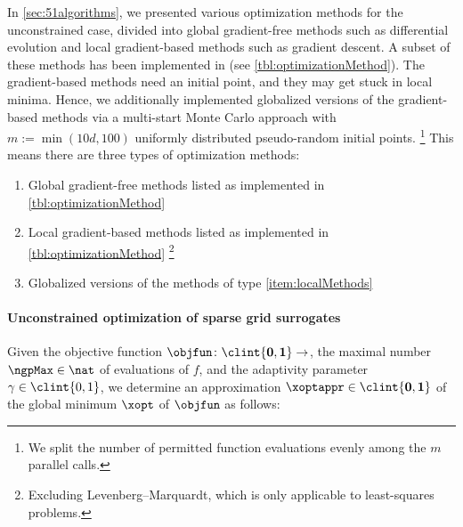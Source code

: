 In \cref{sec:51algorithms}, we presented various optimization methods
for the unconstrained case,
divided into global gradient-free methods such as differential evolution and
local gradient-based methods such as gradient descent.
A subset of these methods has been implemented in \sgpp
(see \cref{tbl:optimizationMethod}).
The gradient-based methods need an initial point, and
they may get stuck in local minima.
Hence, we additionally implemented globalized versions
of the gradient-based methods
via a multi-start Monte Carlo approach with $m := \min(10d, 100)$
uniformly distributed pseudo-random initial points.%
\footnote{%
  We split the number of permitted function evaluations evenly
  among the $m$ parallel calls.%
}
This means there are three types of optimization methods:

\begin{enumerate}[label={(T\arabic*)},leftmargin=*]
  \item
  \label{item:globalMethods}
  Global gradient-free methods listed as implemented in
  \cref{tbl:optimizationMethod}
  
  \item
  \label{item:localMethods}
  Local gradient-based methods listed as implemented in
  \cref{tbl:optimizationMethod}%
  \footnote{%
     Excluding Levenberg--Marquardt, which is only applicable
     to least-squares problems.%
  }
  
  \item
  \label{item:globalizedMethods}
  Globalized versions of the methods of type \ref{item:localMethods}
\end{enumerate}

\paragraph{Unconstrained optimization of sparse grid surrogates}

Given the objective function $\objfun\colon \clint{\*0, \*1} \to \real$,
the maximal number $\ngpMax \in \nat$ of evaluations of $f$, and
the adaptivity parameter $\gamma \in \clint{0, 1}$,
we determine an approximation $\xoptappr \in \clint{\*0, \*1}$
of the global minimum $\xopt$ of $\objfun$ as follows:

